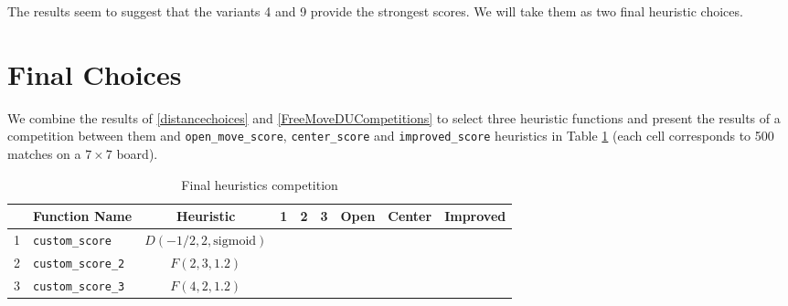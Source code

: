 \documentclass[oneside]{article}   	%
\begin{document}
The results seem to suggest that the variants 4 and 9 provide the strongest scores. We will take them as two final heuristic choices.



\section{Final Choices}

We combine the results of \ref{distancechoices} and \ref{FreeMoveDUCompetitions} to select three heuristic functions and present the results of a competition between them and \texttt{open\_move\_score}, \texttt{center\_score} and \texttt{improved\_score} heuristics in Table \ref{FinalCompetition} (each cell corresponds to 500 matches on a $7\times 7$ board).

\begin{table}[htp]
\caption{Final heuristics competition}
\begin{center}
\begin{tabular}{c|lc|cccccc}
   & Function Name & Heuristic & 1 & 2 & 3 & Open & Center & Improved \\
   \hline
1 & \texttt{custom\_score}    & $D(-1/2, 2, \textrm{sigmoid})$ & & & & & &  \\
2 & \texttt{custom\_score\_2} & $F(2, 3, 1.2)$               & & & & & &  \\
3 & \texttt{custom\_score\_3} & $F(4, 2, 1.2)$               & & & & & &  
\end{tabular}
\end{center}
\label{FinalCompetition}
\end{table}%
\end{document}
